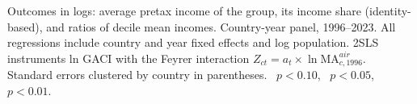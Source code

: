 \begin{table}[H]
\centering
\caption{Mechanism (II): who gains? Group incomes and ratios (2SLS).}
\label{tab:mech_B}
\begin{minipage}{\linewidth}
\centering
{}
\par\vspace{3pt}\begin{flushleft}\footnotesize Outcomes in logs: average pretax income of the group, its income share (identity-based), and ratios of decile mean incomes. Country-year panel, 1996--2023. All regressions include country and year fixed effects and log population. 2SLS instruments ln GACI with the Feyrer interaction $Z_{ct}=a_t\times\ln \mathrm{MA}^{air}_{c,1996}$. Standard errors clustered by country in parentheses. \sym{*}~$p<0.10$, \sym{**}~$p<0.05$, \sym{***}~$p<0.01$.\end{flushleft}
\end{minipage}
\end{table}
